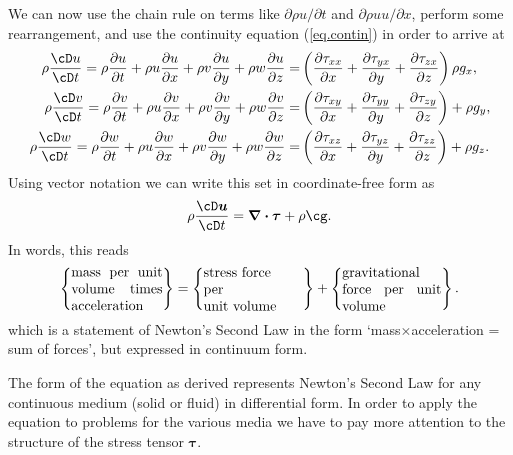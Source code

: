 \documentclass[twoside,11pt]		{report}
\begin{document}
We can now use the chain rule on terms like $\partial \rho u/\partial
t$ and $\partial \rho u u/\partial x$, perform some rearrangement, and
use the continuity equation (\ref{eq.contin}) in order to arrive at
\begin{align}
\rho\frac{\cD u}{\cD t}=\rho\frac{\partial u}{\partial t} + 
\rho u\frac{\partial u}{\partial x} +
\rho v\frac{\partial u}{\partial y} +
\rho w\frac{\partial u}{\partial z} =&
\left(
\frac{\partial \tau_{xx}}{\partial x} +
\frac{\partial \tau_{yx}}{\partial y} +
\frac{\partial \tau_{zx}}{\partial z}
\right)
\rho g_x,\\
\rho\frac{\cD v}{\cD t}=\rho\frac{\partial v}{\partial t} + 
\rho u\frac{\partial v}{\partial x} +
\rho v\frac{\partial v}{\partial y} +
\rho w\frac{\partial v}{\partial z} =&
\left(
\frac{\partial \tau_{xy}}{\partial x} +
\frac{\partial \tau_{yy}}{\partial y} +
\frac{\partial \tau_{zy}}{\partial z}
\right)
+\rho g_y,\\
\rho\frac{\cD w}{\cD t}=\rho\frac{\partial w}{\partial t} + 
\rho u\frac{\partial w}{\partial x} +
\rho v\frac{\partial w}{\partial y} +
\rho w\frac{\partial w}{\partial z} =&
\left(
\frac{\partial \tau_{xz}}{\partial x} +
\frac{\partial \tau_{yz}}{\partial y} +
\frac{\partial \tau_{zz}}{\partial z}
\right)
+\rho g_z.
\end{align}
Using vector notation we can write this set in coordinate-free form as
\begin{equation}
\rho\frac{\cD\bm{u}}{\cD t}=%
\bm{\nabla\cdot\tau} + \rho\bm{\cg}.
\label{eq.momvec}
\end{equation}
In words, this reads
\begin{equation}
\left\{ \parbox{23mm}{mass per unit volume times acceleration} \right\}=
\left\{ \parbox{25mm}{%
                      stress force \\
                      per\\ unit volume} \right\} +
\left\{ \parbox{25mm}{gravitational force per unit volume} \right\}.
\label{eq.newt2_words}
\end{equation}
which is a statement of Newton's Second Law in the form
`mass$\times$acceleration = sum of forces', but expressed in continuum
form.

The form of the equation as derived represents Newton's Second Law for
any continuous medium (solid or fluid) in differential form. In order
to apply the equation to problems for the various media we have to pay
more attention to the structure of the stress tensor $\bm{\tau}$.
\end{document}
